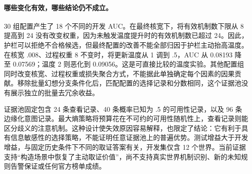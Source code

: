 \paragraph{哪些变化有效，哪些结论仍不成立。}
30 组配置产生了 18 个不同的开发 AUC。在最终核宽下，将有效机制数下限从 8 提高到 24 没有改变权重，因为未触发温度提升时的有效机制数已超过 24。因此，护栏可以拒绝不合格候选，但最终配置的改善不能全部归因于护栏主动抬高温度。在核宽 .008、过程权重 8 不变时，将更新温度从 1 调到 .5，AUC 从 0.08193 降至 0.07569；温度 2 则恶化到 0.09056。这是可直接比较的温度实验。其他配置组同时改变核宽、过程权重或损失聚合方式，不能据此单独确定每个因素的因果贡献。移除批量幻想分支条件化后，匹配配置的选择记录和分数相同，这个证据池没有展示独立的批量去冗余收益。

证据池固定包含 24 条查看记录、40 条概率已知为 .5 的可用性记录，以及 96 条边缘化意图记录。最大熵策略将预算花在不可约的可用性随机性上，查看记录则能区分歧义的注意机制。这种设计使失效原因容易解释，也限定了结论：它有利于具有信息敏感性的选择策略，不能证明任意证据池上的普遍优势。测试增益大于开发增益，与固定历史条件下不同的取证答案有关，开发集仅含 12 个世界。当前证据支持“构造场景中恢复了主动取证价值”，尚不支持真实世界机制识别、新的未知规则告警保证或任何官方榜单成绩。
